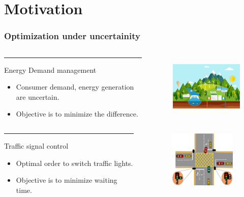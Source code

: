 

\section{Motivation}
\begin{frame}
\frametitle{\centering Optimization under uncertainity}
\begin{small}
\begin{block}{}
\begin{columns}[T]
\begin{column}{.48\textwidth}
\color{red}\rule{\linewidth}{4pt}
Energy Demand management
\begin{itemize}
\item Consumer demand, energy generation are uncertain.
\item Objective is to minimize the difference.
\end{itemize}
\end{column}
\begin{column}{.48\textwidth}
\begin{figure}
\includegraphics[width=5cm,height=3cm]{energymgmt}
\end{figure}
\end{column}
\end{columns}
\end{block}
\pause
\begin{block}{}
\begin{columns}[T]
\begin{column}{.48\textwidth}
\color{blue}\rule{\linewidth}{4pt}
Traffic signal control
\begin{itemize}
\item Optimal order to switch traffic lights.
\item Objective is to minimize waiting time.
\end{itemize}
\end{column}
\begin{column}{.48\textwidth}
\begin{figure}
\includegraphics[width=4cm,height=2.7cm]{traffic}
\end{figure}
\end{column}
\end{columns}
\end{block}

\end{small}
\end{frame}




